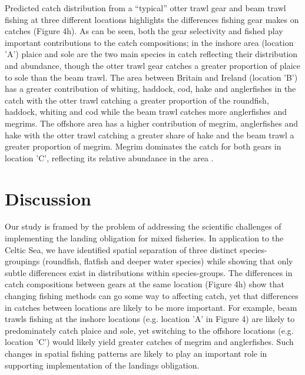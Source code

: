 \documentclass[fleqn,10pt]{wlscirep}
\begin{document}
\begin{linenumbers}
Predicted catch distribution from a ``typical'' otter trawl gear and beam trawl
fishing at three different locations highlights the differences fishing gear
makes on catches (Figure 4h). As can be seen, both the gear selectivity and
 fished play important contributions to the
catch compositions; in the inshore area (location 'A') plaice and sole are the
two main species in  catch reflecting their distribution and
abundance, though the otter trawl gear catches a greater proportion of plaice
to sole than the beam trawl.  The area between Britain and Ireland (location
'B') has a greater contribution of whiting, haddock, cod, hake and anglerfishes
in the catch with the otter trawl catching a greater proportion of the
roundfish, haddock, whiting and cod while the beam trawl catches more
anglerfishes and megrims. The offshore area has a higher contribution of
megrim, anglerfishes and hake with the otter trawl catching a greater share of
hake and the beam trawl a greater proportion of megrim. Megrim dominates the
catch for both gears in location 'C', reflecting its relative abundance in the
area .  \\

\section*{Discussion\\}

Our study is framed by the problem of addressing the scientific challenges of
implementing the landing obligation for mixed fisheries. In application to the
Celtic Sea, we have identified spatial separation of three distinct
species-groupings (roundfish, flatfish and deeper water species) while showing
that only subtle differences exist in distributions within species-groups. The
differences in catch compositions between gears at the same location (Figure
4h) show that changing fishing methods can go some way to affecting catch, yet
that differences in catches between locations are likely to be more important.
For example, beam trawls fishing at the inshore locations (e.g. location 'A' in
Figure 4) are likely to predominately catch plaice and sole, yet switching to
the offshore locations (e.g. location 'C') would likely yield greater catches
of megrim and anglerfishes.  Such changes in spatial fishing patterns are
likely to play an important role in supporting implementation of the landings
obligation.\\


\end{linenumbers}
\end{document}
